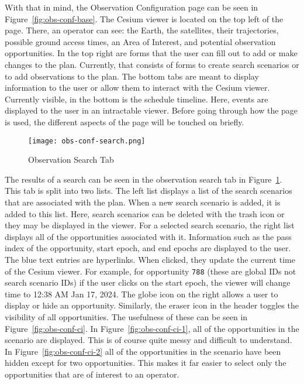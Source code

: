 With that in mind, the Observation Configuration page can be seen in
Figure~\ref{fig:obs-conf-base}. The Cesium viewer is located on the top left of
the page.  There, an operator can see: the Earth, the satellites, their
trajectories, possible ground access times, an Area of Interest, and potential
observation opportunities. In the top right are forms that the user can fill
out to add or make changes to the plan. Currently, that consists of forms to
create search scenarios or to add observations to the plan. The bottom tabs are
meant to display information to the user or allow them to interact with the
Cesium viewer. Currently visible, in the bottom is the schedule timeline.
Here, events are displayed to the user in an intractable viewer. Before going
through how the page is used, the different aspects of the page will be touched
on briefly. 


\begin{figure}[h]
    \centering
    \texttt{[image: obs-conf-search.png]} 
    \caption{Observation Search Tab}
    \label{fig:obs-conf-search} 
\end{figure}

The results of a search can be seen in the observation search tab in
Figure~\ref{fig:obs-conf-search}. This tab is split into two lists. The left
list displays a list of the search scenarios that are associated with the plan.
When a new search scenario is added, it is added to this list. Here, search
scenarios can be deleted with the trash icon or they may be displayed in the
viewer. For a selected search scenario, the right list displays all of the
opportunities associated with it. Information such as the pass index of the
opportunity, start epoch, and end epochs are displayed to the user. The blue
text entries are hyperlinks. When clicked, they update the current time of the
Cesium viewer. For example, for opportunity \texttt{788} (these are global IDs
not search scenario IDs) if the user clicks on the start epoch, the viewer will
change time to 12:38 AM Jan 17, 2024. The globe icon on the right allows a user
to display or hide an opportunity. Similarly, the eraser icon in the header
toggles the visibility of all opportunities.  The usefulness of these can be
seen in Figure~\ref{fig:obs-conf-ci}.  In Figure~\ref{fig:obs-conf-ci-1},
all of the opportunities in the scenario are displayed. This is of course quite
messy and difficult to understand. In Figure~\ref{fig:obs-conf-ci-2} all of
the opportunities in the scenario have been hidden except for two
opportunities. This makes it far easier to select only the opportunities that
are of interest to an operator.


